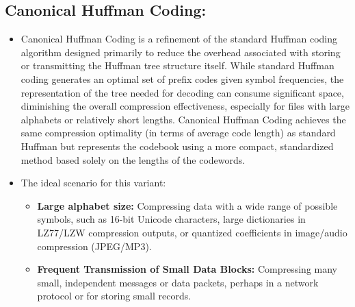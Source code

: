 \subsection{Canonical Huffman Coding:}
\begin{itemize}
    \item Canonical Huffman Coding is a refinement of the standard Huffman coding algorithm designed primarily to reduce the overhead associated with storing or transmitting the Huffman tree structure itself. While standard Huffman coding generates an optimal set of prefix codes given symbol frequencies, the representation of the tree needed for decoding can consume significant space, diminishing the overall compression effectiveness, especially for files with large alphabets or relatively short lengths. Canonical Huffman Coding achieves the same compression optimality (in terms of average code length) as standard Huffman but represents the codebook using a more compact, standardized method based solely on the lengths of the codewords. 
    \item The ideal scenario for this variant:
    \begin{itemize}
        \item \textbf{Large alphabet size:} Compressing data with a wide range of possible symbols, such as 16-bit Unicode characters, large dictionaries in LZ77/LZW compression outputs, or quantized coefficients in image/audio compression (JPEG/MP3).
        \item \textbf{Frequent Transmission of Small Data Blocks:} Compressing many small, independent messages or data packets, perhaps in a network protocol or for storing small records.
    \end{itemize}
\end{itemize}

